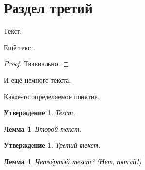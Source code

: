 \documentclass[a4paper, 12pt]{article}
\begin{document}
    \section{Раздел третий}
    \begin{theorem} %
        Текст.
    \end{theorem}
    \begin{theorem} %
        Ещё текст.
    \end{theorem}
    \begin{proof} %
        Твивиально.
    \end{proof}
    \begin{corollary} %
        И ещё немного текста.
    \end{corollary}
    \begin{definition} %
        Какое-то определяемое понятие.
    \end{definition}
    \pagebreak


    \newtheorem{proposition}[my_count]{Утверждение} %
    \newtheorem{lemma}[my_count]{Лемма} %

    \begin{proposition} %
        Текст.
    \end{proposition}
    \begin{lemma} %
        Второй текст.
    \end{lemma}
    \begin{proposition} %
        Третий текст.
    \end{proposition}

    \begin{lemma} %
        Четвёртый текст? (Нет, пятый!)
    \end{lemma}

\end{document}
